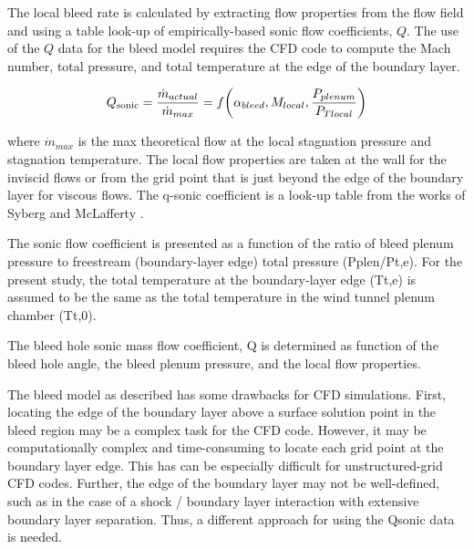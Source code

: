 The local bleed rate is calculated by extracting flow properties from the flow field and using a table look-up of empirically-based sonic flow coefficients, $Q$. The use of the $Q$ data for the bleed model requires the CFD code to compute the Mach number, total pressure, and total temperature at the edge of the boundary layer.

$$ Q_{\textrm{sonic}} = \frac{\dot{m}_{actual}}{\dot{m}_{max}} = f\qty(\alpha_{bleed},M_{local},\dfrac{P_{plenum}}{P_{Tlocal}}) $$

where $\dot{m}_{max}$ is the max theoretical flow at the local stagnation pressure and stagnation temperature. The local flow properties are taken at the wall for the inviscid flows or from the grid point that is just beyond the edge of the boundary layer for viscous flows. The q-sonic coefficient is a look-up table from the works of Syberg \cite{Syberg1973} and McLafferty \cite{McLafferty1958}.

The sonic flow coefficient is presented as a function of the ratio of bleed plenum pressure to freestream (boundary-layer edge) total pressure (Pplen/Pt,e). For the present study, the total temperature at the boundary-layer edge (Tt,e) is assumed to be the same as the total temperature in the wind tunnel plenum chamber (Tt,0).

The bleed hole sonic mass flow coefficient, Q is determined as function of the bleed hole angle, the bleed plenum pressure, and the local flow properties. 


 

The bleed model as described has some drawbacks for CFD simulations. First, locating the edge of the boundary layer above a surface solution point in the bleed region may be a complex task for the CFD code. However, it may be computationally complex and time-consuming to locate each grid point at the boundary layer edge. This has can be especially difficult for unstructured-grid CFD codes. Further, the edge of the boundary layer may not be well-defined, such as in the case of a shock / boundary layer interaction with extensive boundary layer separation. Thus, a different approach for using the Qsonic data is needed. 


